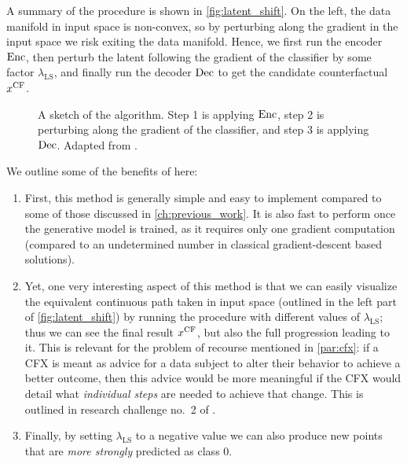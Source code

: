 \documentclass[../main.tex]{subfiles}
\begin{document}
A summary of the \ls{} procedure is shown in \autoref{fig:latent_shift}.
On the left, the data manifold in input space is non-convex, so by perturbing along the gradient in the input space we risk exiting the data manifold.
Hence, we first run the encoder $\operatorname{Enc}$, then perturb the latent following the gradient of the classifier by some factor $\lambda_\text{LS}$, and finally run the decoder $\operatorname{Dec}$ to get the candidate counterfactual $x^\mathrm{CF}$.

\begin{figure}[htbp]
	\centering

	\caption{A sketch of the \ls{} algorithm. Step 1 is applying $\operatorname{Enc}$, step 2 is perturbing along the gradient of the classifier, and step 3 is applying $\operatorname{Dec}$. Adapted from \cite{cohenGifsplanation2022}.}
	\label{fig:latent_shift}
\end{figure}

We outline some of the benefits of \ls{} here:

\begin{enumerate}
	\item First, this method is generally simple and easy to implement compared to some of those discussed in \autoref{ch:previous_work}.
	      It is also fast to perform once the generative model is trained, as it requires only one gradient computation (compared to an undetermined number in classical gradient-descent based solutions).

	\item Yet, one very interesting aspect of this method is that we can easily visualize the equivalent continuous path taken in input space (outlined in the left part of \autoref{fig:latent_shift}) by running the procedure with different values of $\lambda_\text{LS}$; thus we can see the final result $x^\mathrm{CF}$, but also the full progression leading to it.
	      This is relevant for the problem of recourse mentioned in \autoref{par:cfx}: if a CFX is meant as advice for a data subject to alter their behavior to achieve a better outcome, then this advice would be more meaningful if the CFX would detail what \emph{individual steps} are needed to achieve that change.
	      This is outlined in research challenge no.~2 of \cite{vermaCounterfactual2020}.

	\item Finally, by setting $\lambda_\text{LS}$ to a negative value we can also produce new points that are \emph{more strongly} predicted as class 0.
\end{enumerate}
\end{document}
